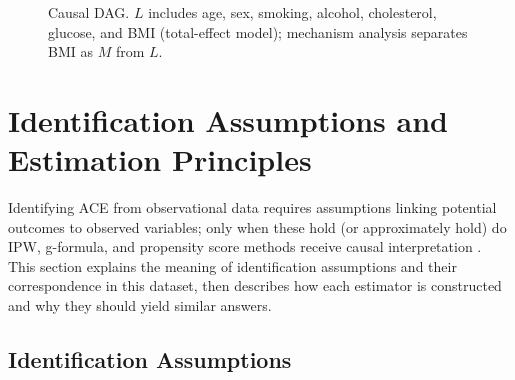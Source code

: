 \documentclass[12pt,a4paper]{article}
\begin{document}
\begin{figure}[H]
\centering
{}
\caption{Causal DAG. $L$ includes age, sex, smoking, alcohol, cholesterol, glucose, and BMI (total-effect model); mechanism analysis separates BMI as $M$ from $L$.}
\label{fig:dag}
\end{figure}

\section{Identification Assumptions and Estimation Principles}

Identifying ACE from observational data requires assumptions linking potential outcomes to observed variables; only when these hold (or approximately hold) do IPW, g-formula, and propensity score methods receive causal interpretation \cite{hernan2024whatif}. This section explains the meaning of identification assumptions and their correspondence in this dataset, then describes how each estimator is constructed and why they should yield similar answers.

\subsection{Identification Assumptions}
\end{document}

